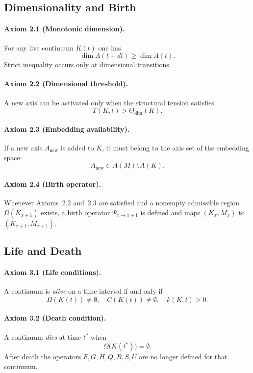 \subsection{Dimensionality and Birth}

\paragraph{Axiom 2.1 (Monotonic dimension).}
For any live continuum \(K(t)\) one has
\[
  \dim A(t+dt) \ge \dim A(t).
\]
Strict inequality occurs only at dimensional transitions.

\paragraph{Axiom 2.2 (Dimensional threshold).}
A new axis can be activated only when the structural tension satisfies
\[
  T(K,t) > \Theta_{\mathrm{dim}}(K).
\]

\paragraph{Axiom 2.3 (Embedding availability).}
If a new axis \(A_{\mathrm{new}}\) is added to \(K\), it must belong to the
axis set of the embedding space:
\[
  A_{\mathrm{new}}\in A(M)\setminus A(K).
\]

\paragraph{Axiom 2.4 (Birth operator).}
Whenever Axioms~2.2 and~2.3 are satisfied and a nonempty admissible region
\(\Omega(K_{x+1})\) exists, a birth operator \(\Psi_{x\to x+1}\) is defined and
maps \((K_x,M_x)\) to \((K_{x+1},M_{x+1})\).

\subsection{Life and Death}

\paragraph{Axiom 3.1 (Life conditions).}
A continuum is \emph{alive} on a time interval if and only if
\[
  \Omega(K(t))\neq\emptyset,\quad
  C(K(t))\neq\emptyset,\quad
  k(K,t)>0.
\]

\paragraph{Axiom 3.2 (Death condition).}
A continuum \emph{dies} at time \(t^{\ast}\) when
\[
  \Omega\big(K(t^{\ast})\big) = \emptyset.
\]
After death the operators \(F,G,H,Q,R,S,U\) are no longer defined for that
continuum.

